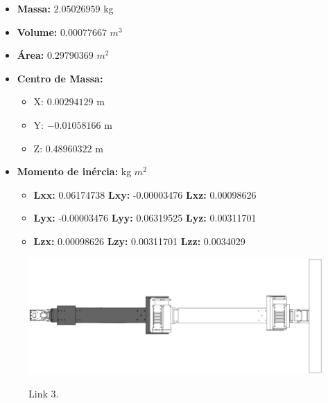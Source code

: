 \documentclass[
12pt,					%
openright,				%
twoside,				%
a4paper,				%
english,
brazil
]{ABNT/abntex2_report}
\begin{document}
	\begin{itemize}
		\item \textbf{Massa:} $2.05026959$ kg		
		\item \textbf{Volume:} $0.00077667$ $m^{3}$
		\item \textbf{Área:} $0.29790369$ $m^{2}$
		\item \textbf{Centro de  Massa:}
		\begin{itemize}
			\item X: $0.00294129$ m			
			\item Y: $-0.01058166$ m			
			\item Z: $0.48960322$ m			
		\end{itemize}
		
		\item \textbf{Momento de inércia:} kg $m^{2}$
		\begin{itemize}
			\item \textbf{Lxx:} 0.06174738 \textbf{Lxy:} -0.00003476 \textbf{Lxz:} 0.00098626			
			\item \textbf{Lyx:} -0.00003476	\textbf{Lyy:} 0.06319525 \textbf{Lyz:} 0.00311701			 
			\item \textbf{Lzx:} 0.00098626 \textbf{Lzy:} 0.00311701 \textbf{Lzz:} 0.0034029			  
		\end{itemize}
	\end{itemize}
	

	\begin{figure}[H]
		\centering
		\caption{Link 3.}
		\includegraphics[scale=1.2]{appendix/link3.jpg}
		\label{fig:link3}
	\end{figure}
\end{document}
